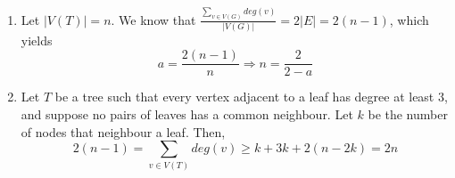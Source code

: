 \documentclass[11pt]{article}
\begin{document}
\begin{enumerate}[1]
    \item %
        Let $|V(T)| = n$. We know that $\frac{\sum_{v \in V(G)} deg(v)}{|V(G)|} 
        = 2|E| = 2(n - 1)$, which yields
        $$ a = \frac{2(n-1)}{n} \Rightarrow n = \frac{2}{2-a}$$ 

    \item %
        Let $T$ be a tree such that every vertex adjacent to a leaf has degree
        at least $3$, and suppose no pairs of leaves has a common neighbour. 
        Let $k$ be the number of nodes that neighbour a leaf. Then,
        $$2(n-1) = \sum_{v \in V(T)} deg(v) \geq k + 3k + 2(n-2k) = 2n$$


\end{enumerate}
\end{document}
